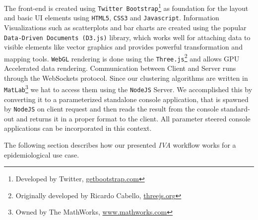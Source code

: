 \documentclass[journal]{style/vgtc} 			          %
\begin{document}
The front-end is created using \texttt{Twitter Bootstrap}\footnote{Developed by Twitter, \url{getbootstrap.com}} as foundation for the layout and basic UI elements using \texttt{HTML5}, \texttt{CSS3} and \texttt{Javascript}.
%
Information Visualizations such as scatterplots and bar charts are created using the popular \texttt{Data-Driven Documents (D3.js)} \cite{D3} library, which works well for attaching data to visible elements like vector graphics and provides powerful transformation and mapping tools.
%
\texttt{WebGL} rendering is done using the \texttt{Three.js}\footnote{Originally developed by Ricardo Cabello, \url{threejs.org}} and allows GPU Accelerated data rendering.
%
Communication between Client and Server runs through the WebSockets protocol.
%
Since our clustering algorithms are written in \texttt{MatLab}\footnote{Owned by The MathWorks, \url{www.mathworks.com}} we hat to access them using the \texttt{NodeJS} Server.
%
We accomplished this by converting it to a parameterized standalone console application, that is spawned by \texttt{NodeJS} on client request and then reads the result from the console standard-out and returns it in a proper format to the client.
%
All parameter steered console applications can be incorporated in this context.

The following section describes how our presented \emph{IVA} workflow works for a epidemiological use case.
\end{document}
